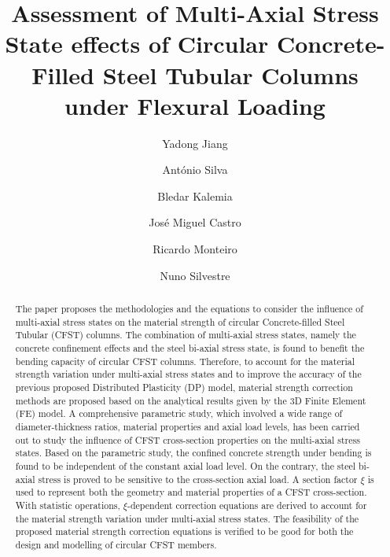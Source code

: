 \documentclass[12pt,a4]{article}
\title{Assessment of Multi-Axial Stress State effects of Circular Concrete-Filled Steel Tubular Columns under Flexural Loading}
\author{Yadong Jiang \and António Silva \and Bledar Kalemia \and José Miguel Castro \and Ricardo Monteiro \and Nuno Silvestre}
\date{}
\begin{document}
	\maketitle
	
	\begin{abstract}
		The paper proposes the methodologies and the equations to consider the influence of multi-axial stress states on the material strength of circular Concrete-filled Steel Tubular (CFST) columns. The combination of multi-axial stress states, namely the concrete confinement effects and the steel bi-axial stress state, is found to benefit the bending capacity of circular CFST columns. Therefore, to account for the material strength variation under multi-axial stress states and to improve the accuracy of the previous proposed Distributed Plasticity (DP) model, material strength correction methods are proposed based on the analytical results given by the 3D Finite Element (FE) model. A comprehensive parametric study, which involved a wide range of diameter-thickness ratios, material properties and axial load levels, has been carried out to study the influence of CFST cross-section properties on the multi-axial stress states. Based on the parametric study, the confined concrete strength under bending is found to be independent of the constant axial load level. On the contrary, the steel bi-axial stress is proved to be sensitive to the cross-section axial load. A section factor $\xi$ is used to represent both the geometry and material properties of a CFST cross-section. With statistic operations, $\xi$-dependent correction equations are derived to account for the material strength variation under multi-axial stress states. The feasibility of the proposed material strength correction equations is verified to be good for both the design and modelling of circular CFST members.
	\end{abstract}
\end{document}
